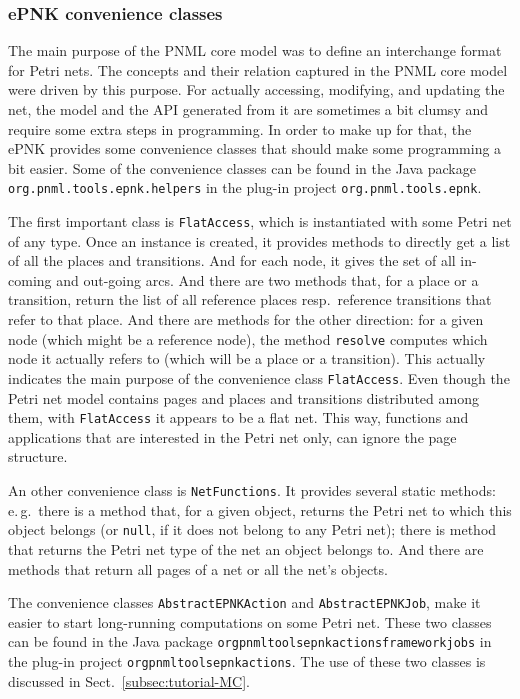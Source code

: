 \subsubsection{ePNK convenience classes}
\label{subsubsec:developer:functitions:utilities:convenience}

The main purpose of the PNML core model was to define an interchange format
for Petri nets. The concepts and their relation captured
in the PNML core model were driven by this purpose. For actually accessing,
modifying, and updating the net, the model and the API generated from it
are sometimes a bit clumsy and require some extra steps in programming.
In order to make up for that, the ePNK provides some convenience
classes that should make some programming a bit easier. Some of the
convenience classes can be found in the Java package
{\tt org.pnml.tools.epnk.helpers} in the plug-in project
{\tt org.pnml.tools.epnk}.

The first important class is {\tt FlatAccess},%
which is instantiated with some Petri net of any type. Once an instance is
created, it provides methods to directly get a list of all the places and
transitions. And for each node, it gives the set of all in-coming and out-going
arcs. And there are two methods that, for a place or a transition, return the
list of all reference places resp.\ reference transitions that refer to that place.
And there are methods for the other direction: for a given node
(which might be a reference node), the method {\tt resolve} computes
which node it actually refers to (which will be a place or a transition).
This actually indicates the main purpose of the convenience class
{\tt FlatAccess}. Even though the Petri net model contains pages and
places and transitions distributed among them, with {\tt FlatAccess}
it appears to be a flat net. This way, functions and applications that
are interested in the Petri net only, can ignore the page structure.

An other convenience class is {\tt NetFunctions}.%
It provides several static methods: e.\,g.\ there is a method that, for a
given object, returns the Petri net to which this object belongs (or {\tt null},
if it does not belong to any Petri  net); there is method that returns the Petri net
type of the net an object belongs to. And there are methods that return
all pages of a net or all the net's objects. 

The convenience classes {\tt AbstractEPNKAction}%
and {\tt AbstractEPNKJob},%
make it easier to start long-running computations on some Petri net. These
two classes can be found in the Java package
{\tt org\qnsep{}pnml\qnsep{}tools\qnsep{}epnk\qnsep{}actions\qnsep{}framework\qnsep{}jobs}
in the plug-in project
{\tt org\qnsep{}pnml\qnsep{}tools\qnsep{}epnk\qnsep{}actions}.
The use of these two classes is discussed in Sect.~\ref{subsec:tutorial-MC}.%

